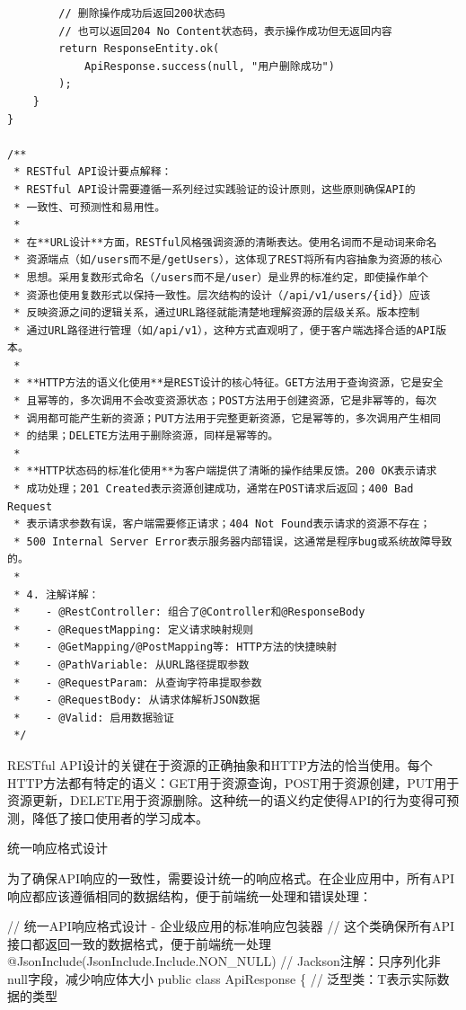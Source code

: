 \begin{lstlisting}
        // 删除操作成功后返回200状态码
        // 也可以返回204 No Content状态码，表示操作成功但无返回内容
        return ResponseEntity.ok(
            ApiResponse.success(null, "用户删除成功")
        );
    }
}

/**
 * RESTful API设计要点解释：
 * RESTful API设计需要遵循一系列经过实践验证的设计原则，这些原则确保API的
 * 一致性、可预测性和易用性。
 * 
 * 在**URL设计**方面，RESTful风格强调资源的清晰表达。使用名词而不是动词来命名
 * 资源端点（如/users而不是/getUsers），这体现了REST将所有内容抽象为资源的核心
 * 思想。采用复数形式命名（/users而不是/user）是业界的标准约定，即使操作单个
 * 资源也使用复数形式以保持一致性。层次结构的设计（/api/v1/users/{id}）应该
 * 反映资源之间的逻辑关系，通过URL路径就能清楚地理解资源的层级关系。版本控制
 * 通过URL路径进行管理（如/api/v1），这种方式直观明了，便于客户端选择合适的API版本。
 * 
 * **HTTP方法的语义化使用**是REST设计的核心特征。GET方法用于查询资源，它是安全
 * 且幂等的，多次调用不会改变资源状态；POST方法用于创建资源，它是非幂等的，每次
 * 调用都可能产生新的资源；PUT方法用于完整更新资源，它是幂等的，多次调用产生相同
 * 的结果；DELETE方法用于删除资源，同样是幂等的。
 * 
 * **HTTP状态码的标准化使用**为客户端提供了清晰的操作结果反馈。200 OK表示请求
 * 成功处理；201 Created表示资源创建成功，通常在POST请求后返回；400 Bad Request
 * 表示请求参数有误，客户端需要修正请求；404 Not Found表示请求的资源不存在；
 * 500 Internal Server Error表示服务器内部错误，这通常是程序bug或系统故障导致的。
 * 
 * 4. 注解详解：
 *    - @RestController: 组合了@Controller和@ResponseBody
 *    - @RequestMapping: 定义请求映射规则
 *    - @GetMapping/@PostMapping等: HTTP方法的快捷映射
 *    - @PathVariable: 从URL路径提取参数
 *    - @RequestParam: 从查询字符串提取参数
 *    - @RequestBody: 从请求体解析JSON数据
 *    - @Valid: 启用数据验证
 */
\end{lstlisting}

RESTful API设计的关键在于资源的正确抽象和HTTP方法的恰当使用。每个HTTP方法都有特定的语义：GET用于资源查询，POST用于资源创建，PUT用于资源更新，DELETE用于资源删除。这种统一的语义约定使得API的行为变得可预测，降低了接口使用者的学习成本。

 统一响应格式设计

为了确保API响应的一致性，需要设计统一的响应格式。在企业应用中，所有API响应都应该遵循相同的数据结构，便于前端统一处理和错误处理：

// 统一API响应格式设计 - 企业级应用的标准响应包装器 // 这个类确保所有API接口都返回一致的数据格式，便于前端统一处理 @JsonInclude(JsonInclude.Include.NON\_NULL) // Jackson注解：只序列化非null字段，减少响应体大小 public class ApiResponse \{ // 泛型类：T表示实际数据的类型

